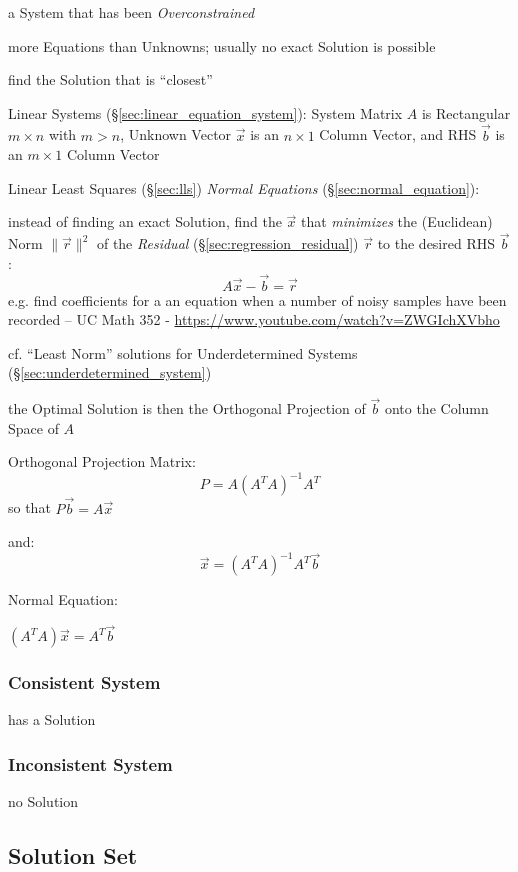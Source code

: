 a System that has been \emph{Overconstrained}

more Equations than Unknowns; usually no exact Solution is possible

find the Solution that is ``closest''

Linear Systems (\S\ref{sec:linear_equation_system}): System Matrix $A$ is
Rectangular $m \times n$ with $m > n$, Unknown Vector $\vec{x}$ is an $n \times
1$ Column Vector, and RHS $\vec{b}$ is an $m \times 1$ Column Vector

Linear Least Squares (\S\ref{sec:lls}) \emph{Normal Equations}
(\S\ref{sec:normal_equation}):

instead of finding an exact Solution, find the $\vec{x}$ that \emph{minimizes}
the (Euclidean) Norm $\|\vec{r}\|^2$ of the \emph{Residual}
(\S\ref{sec:regression_residual}) $\vec{r}$ to the desired RHS $\vec{b}$:
\[
  A\vec{x} - \vec{b} = \vec{r}
\]
e.g. find coefficients for a an equation when a number of noisy samples have
been recorded -- UC Math 352 - \url{https://www.youtube.com/watch?v=ZWGIchXVbho}

cf. ``Least Norm'' solutions for Underdetermined Systems
(\S\ref{sec:underdetermined_system})

the Optimal Solution is then the Orthogonal Projection of $\vec{b}$ onto the
Column Space of $A$

Orthogonal Projection Matrix:
\[
  P = A(A^TA)^{-1}A^T
\]
so that $P\vec{b} = A\vec{x}$

and:
\[
  \vec{x} = (A^TA)^{-1}A^T\vec{b}
\]

Normal Equation:

$(A^TA)\vec{x} = A^T\vec{b}$



\subsubsection{Consistent System}\label{sec:consistent_system}

has a Solution



\subsubsection{Inconsistent System}\label{sec:inconsistent_system}

no Solution



\subsection{Solution Set}\label{sec:solution_set}

